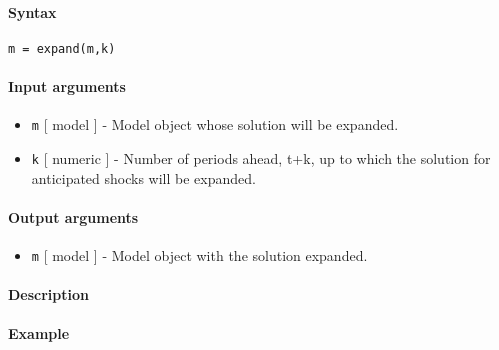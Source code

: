 


	\paragraph{Syntax}\label{syntax}

\begin{verbatim}
m = expand(m,k)
\end{verbatim}

\paragraph{Input arguments}\label{input-arguments}

\begin{itemize}
\item
  \texttt{m} {[} model {]} - Model object whose solution will be
  expanded.
\item
  \texttt{k} {[} numeric {]} - Number of periods ahead, t+k, up to which
  the solution for anticipated shocks will be expanded.
\end{itemize}

\paragraph{Output arguments}\label{output-arguments}

\begin{itemize}
\itemsep1pt\parskip0pt
\item
  \texttt{m} {[} model {]} - Model object with the solution expanded.
\end{itemize}

\paragraph{Description}\label{description}

\paragraph{Example}\label{example}


